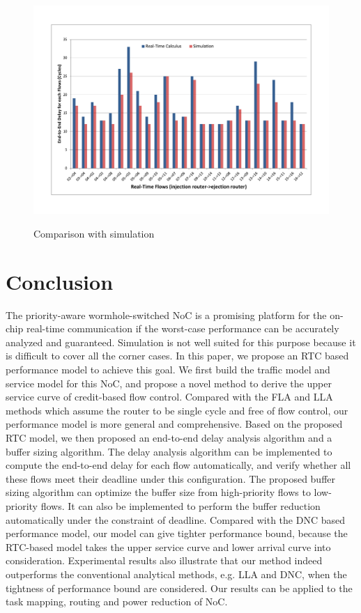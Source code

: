 \documentclass[preprint]{elsarticle}
\begin{document}
\begin{figure}
  \centering
  \includegraphics[scale=0.45]{figures/ericsson.pdf}\\
  \caption{Comparison with simulation}\label{ericsson}
\end{figure}

\section{Conclusion}\label{conclusion}
The priority-aware wormhole-switched NoC is a promising platform for the on-chip real-time communication if the worst-case performance can be accurately analyzed and guaranteed. Simulation is not well suited for this purpose because it is difficult to cover all the corner cases. In this paper, we propose an RTC based performance model to achieve this goal. We first build the traffic model and service model for this NoC, and propose a novel method to derive the upper service curve of credit-based flow control. Compared with the FLA and LLA methods which assume the router to be single cycle and free of flow control, our performance model is more general and comprehensive. Based on the proposed RTC model, we then proposed an end-to-end delay analysis algorithm and a buffer sizing algorithm. The delay analysis algorithm can be implemented to compute the end-to-end delay for each flow automatically, and verify whether all these flows meet their deadline under this configuration. The proposed buffer sizing algorithm can optimize the buffer size from high-priority flows to low-priority flows. It can also be implemented to perform the buffer reduction automatically under the constraint of deadline. Compared with the DNC based performance model, our model can give tighter performance bound, because the RTC-based model takes the upper service curve and lower arrival curve into consideration. Experimental results also illustrate that our method indeed outperforms the conventional analytical methods, e.g. LLA and DNC, when the tightness of performance bound are considered. Our results can be applied to the task mapping, routing and power reduction of NoC.
\end{document}
